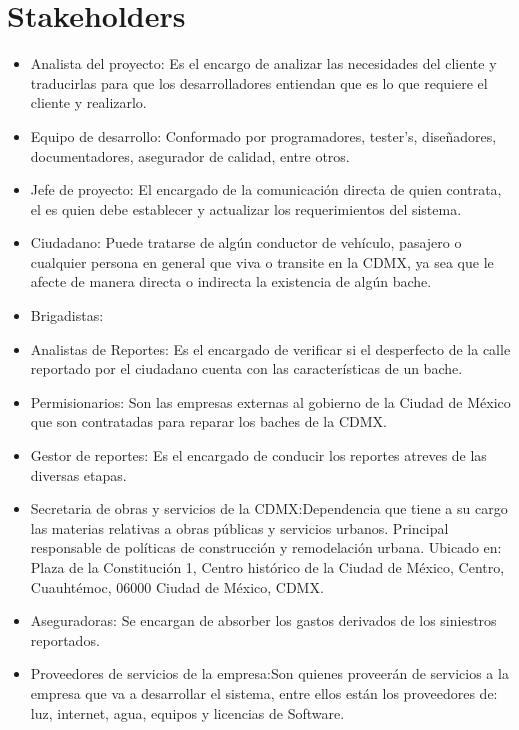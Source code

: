 \chapter{Stakeholders}
\begin{itemize}
    \item Analista del proyecto: Es el encargo de analizar las necesidades del cliente y traducirlas para que los desarrolladores entiendan que es lo que requiere el cliente y realizarlo.
    \item Equipo de desarrollo: Conformado por programadores, tester’s, diseñadores, documentadores, asegurador de calidad, entre otros.
    \item Jefe de proyecto: El encargado de la comunicación directa de quien contrata, el es quien debe establecer y actualizar los requerimientos del sistema.
    \item Ciudadano: Puede tratarse de algún conductor de vehículo, pasajero o cualquier persona en general que viva o transite en la CDMX, ya sea que le afecte de manera directa o indirecta la existencia de algún bache.
    
    
    
    \item Brigadistas: 
    
    
    
    \item Analistas de Reportes: Es el encargado de verificar si el desperfecto de la calle reportado por el ciudadano cuenta con las características de un bache. 
    \item Permisionarios: Son las empresas externas al gobierno de la Ciudad de México que son contratadas para reparar los baches de la CDMX.
    \item Gestor de reportes: Es el encargado de conducir los reportes atreves de las diversas etapas.
    \item Secretaria de obras y servicios de la CDMX:Dependencia que tiene a su cargo las materias relativas a obras públicas y servicios urbanos. Principal responsable de políticas de construcción y remodelación urbana. Ubicado en: Plaza de la Constitución 1, Centro  histórico de la Ciudad de México, Centro, Cuauhtémoc, 06000 Ciudad de México, CDMX.
    \item Aseguradoras: Se encargan de absorber los gastos derivados de los siniestros reportados.
    \item Proveedores de servicios de la empresa:Son quienes proveerán de servicios a la empresa que va a desarrollar el sistema, entre ellos están los proveedores de: luz, internet, agua, equipos y licencias de Software.
\end{itemize}



